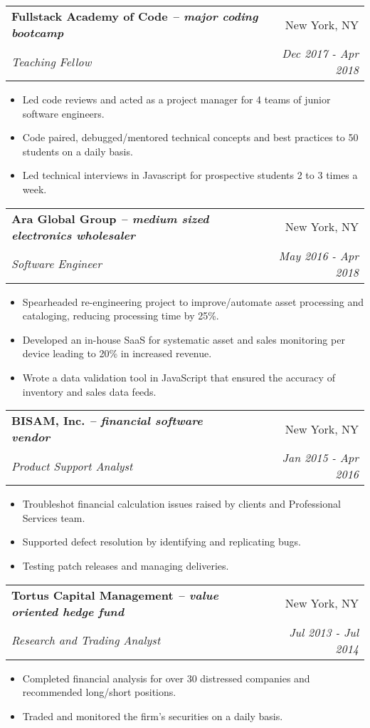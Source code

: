 \documentclass[letterpaper,10pt]{article}
\makeatletter
\newcommand{\resumeItemSimple}[1]{
    \item\small{
      {#1}{\vspace{-2pt}}
    }
  }
\newcommand{\resumeSubheading}[4]{
    \vspace{-1pt}\item
      \begin{tabular*}{0.97\textwidth}{l@{\extracolsep{\fill}}r}
        \textbf{#1} & #2 \\
        \textit{\small#3} & \textit{\small #4} \\
      \end{tabular*}\vspace{-5pt}
  }
\newcommand{\resumeItemListStart}{\begin{itemize}}
\newcommand{\resumeItemListEnd}{\end{itemize}\vspace{-5pt}}
\newcommand{\engineerType}{Software Engineer}
\makeatother
\begin{document}
      \resumeSubheading
        {Fullstack Academy of Code \normalfont\textit{-- major coding bootcamp}}{New York, NY}
        {Teaching Fellow}{Dec 2017 - Apr 2018}
        \resumeItemListStart
          \resumeItemSimple{Led code reviews and acted as a project manager for 4 teams of junior software engineers.}
          \resumeItemSimple{Code paired, debugged/mentored technical concepts and best practices to 50 students on a daily basis.}
          \resumeItemSimple{Led technical interviews in Javascript for prospective students 2 to 3 times a week.}
        \resumeItemListEnd

      \resumeSubheading
        {Ara Global Group \normalfont\textit{-- medium sized electronics wholesaler}}{New York, NY}
        {\engineerType{}}{May 2016 - Apr 2018}
        \resumeItemListStart
        	\resumeItemSimple{Spearheaded re-engineering project to improve/automate asset processing and  cataloging, reducing processing time by 25\%.}
          \resumeItemSimple{Developed an in-house SaaS for systematic asset and sales monitoring per device leading to 20\% in increased revenue.}
          \resumeItemSimple{Wrote a data validation tool in JavaScript that ensured the accuracy of inventory and sales data feeds.}
        \resumeItemListEnd

      \resumeSubheading
        {BISAM, Inc. \normalfont\textit{-- financial software vendor}}{New York, NY}
        {Product Support Analyst}{Jan 2015 - Apr 2016}
        \resumeItemListStart
          \resumeItemSimple{Troubleshot financial calculation issues raised by clients and Professional Services team.}
          \resumeItemSimple{Supported defect resolution by identifying and replicating bugs.}
          \resumeItemSimple{Testing patch releases and managing deliveries.}
        \resumeItemListEnd

      \resumeSubheading
        {Tortus Capital Management \normalfont\textit{-- value oriented hedge fund}}{New York, NY}
        {Research and Trading Analyst}{Jul 2013 - Jul 2014}
        \resumeItemListStart
          \resumeItemSimple{Completed financial analysis for over 30 distressed companies and recommended long/short positions.}
          \resumeItemSimple{Traded and monitored the firm's securities on a daily basis.}
        \resumeItemListEnd
\end{document}
